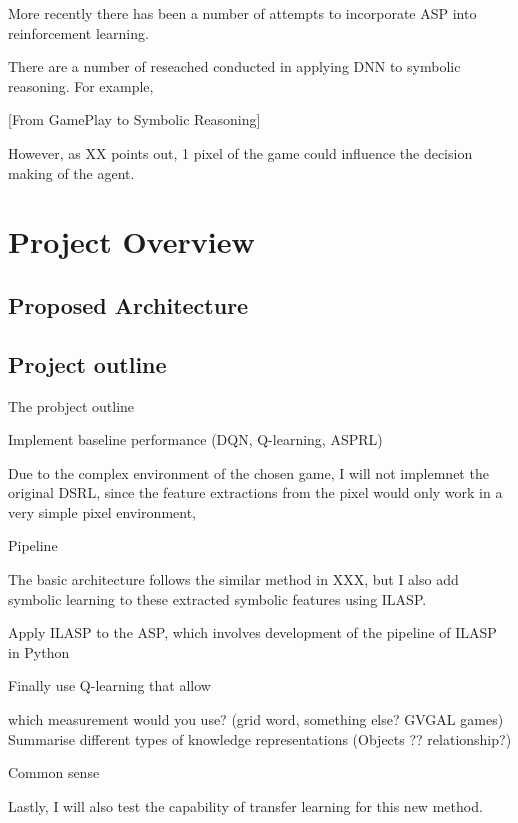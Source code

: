 \documentclass[12pt,twoside]{report}
\begin{document}
More recently there has been a number of attempts to incorporate ASP into reinforcement learning.

There are a number of reseached conducted in applying DNN to symbolic reasoning.
For example,

[From GamePlay to Symbolic Reasoning]


However, as XX points out, 1 pixel of the game could influence the decision making of the agent.


\chapter{Project Overview}

\section{Proposed Architecture}

\section{Project outline}

The probject outline

Implement baseline performance (DQN, Q-learning, ASPRL)

Due to the complex environment of the chosen game, I will not implemnet the original DSRL, since the feature extractions from the pixel would only work in a very simple pixel environment,

Pipeline

The basic architecture follows the similar method in XXX, but I also add symbolic learning to these extracted symbolic features using ILASP.

Apply ILASP to the ASP, which involves development of the pipeline of ILASP in Python

Finally use Q-learning that allow

which measurement would you use? (grid word, something else? GVGAL games)
Summarise different types of knowledge representations (Objects ?? relationship?)

Common sense

Lastly, I will also test the capability of transfer learning for this new method.

%
%
\end{document}
